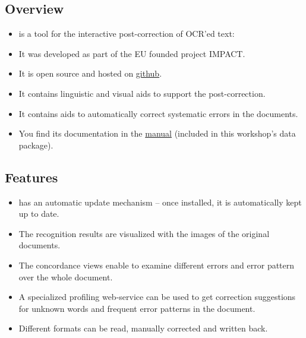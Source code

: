 \subsection{Overview}
\begin{frame}
	\begin{itemize}
		\item \pocoto{} is a tool for the interactive post-correction of OCR'ed
			text:
		\item It was developed as part of the EU founded project IMPACT.
		\item It is open source and hosted on
			\href{https://github.com/cisocrgroup/PoCoTo}{github}.
		\item It contains linguistic and visual aids to support the post-correction.
		\item It contains aids to automatically correct systematic errors in the
			documents.
		\item You find its documentation in the
			\href{https://github.com/cisocrgroup/Resources/blob/master/manuals/pocoto-manual.md}{\pocoto{}
			manual} (included in this workshop's data package).
	\end{itemize}
\end{frame}

\subsection{Features}
\begin{frame}
	\begin{itemize}
		\item \pocoto{} has an automatic update mechanism -- once installed, it is
			automatically kept up to date.
		\item The recognition results are visualized with the images of the original
			documents.
		\item The concordance views enable to examine different errors and error
			pattern over the whole document.
		\item A specialized profiling web-service can be used to get correction
			suggestions for unknown words and frequent error patterns in the document.
		\item Different formats can be read, manually corrected and written back.
	\end{itemize}
\end{frame}

